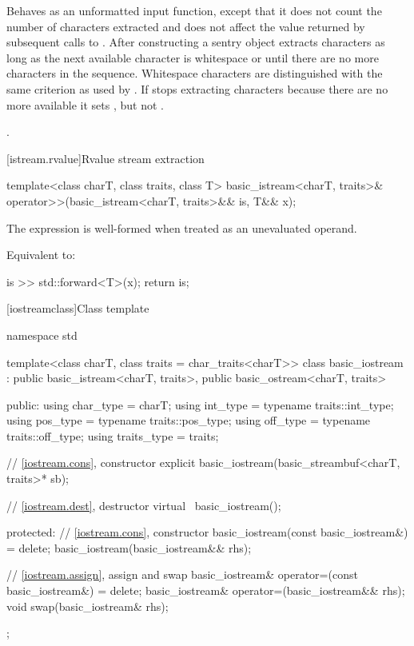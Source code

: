 \begin{itemdescr}
\pnum
\effects
Behaves as an unformatted input function, except that it does not count the number of characters extracted and
does not affect the value returned by subsequent calls to . After
constructing a sentry object extracts characters as long as the next available
character  is whitespace or until there are no more characters in the sequence.
Whitespace characters are distinguished with the same criterion as used by
.
If
stops extracting characters because there are no more available it sets
,
but not
.

\pnum
\returns
{}.
\end{itemdescr}

[istream.rvalue]{Rvalue stream extraction}

%
\begin{itemdecl}
template<class charT, class traits, class T>
  basic_istream<charT, traits>& operator>>(basic_istream<charT, traits>&& is, T&& x);
\end{itemdecl}

\begin{itemdescr}
\pnum
\constraints The expression  is well-formed when treated as an unevaluated operand.

\pnum
\effects
Equivalent to:
\begin{codeblock}
is >> std::forward<T>(x);
return is;
\end{codeblock}
\end{itemdescr}

[iostreamclass]{Class template }

%
\begin{codeblock}
namespace std {
  template<class charT, class traits = char_traits<charT>>
  class basic_iostream
    : public basic_istream<charT, traits>,
      public basic_ostream<charT, traits> {
  public:
    using char_type   = charT;
    using int_type    = typename traits::int_type;
    using pos_type    = typename traits::pos_type;
    using off_type    = typename traits::off_type;
    using traits_type = traits;

    // \ref{iostream.cons}, constructor
    explicit basic_iostream(basic_streambuf<charT, traits>* sb);

    // \ref{iostream.dest}, destructor
    virtual ~basic_iostream();

  protected:
    // \ref{iostream.cons}, constructor
    basic_iostream(const basic_iostream&) = delete;
    basic_iostream(basic_iostream&& rhs);

    // \ref{iostream.assign}, assign and swap
    basic_iostream& operator=(const basic_iostream&) = delete;
    basic_iostream& operator=(basic_iostream&& rhs);
    void swap(basic_iostream& rhs);
  };
}
\end{codeblock}

